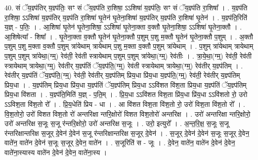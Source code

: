 \documentclass[17pt]{extarticle}
\begin{document}
40. सं ॅय॒ज्ञ्प॑तिर् य॒ज्ञ्प॑तिः॒ सꣳ सं ॅय॒ज्ञ्प॑ति रा॒शिषा॒ ऽऽशिषा॑ य॒ज्ञ्प॑तिः॒ सꣳ सं ॅय॒ज्ञ्प॑ति रा॒शिषा᳚ । . य॒ज्ञ्प॑ति रा॒शिषा॒ ऽऽशिषा॑ य॒ज्ञ्प॑तिर् य॒ज्ञ्प॑ति रा॒शिषा॑ घृ॒तेन॑ घृ॒तेना॒शिषा॑ य॒ज्ञ्प॑तिर् य॒ज्ञ्प॑ति रा॒शिषा॑ घृ॒तेन॑ । . य॒ज्ञ्प॑ति॒रिति॑ य॒ज्ञ् - प॒तिः॒ । . आ॒शिषा॑ घृ॒तेन॑ घृ॒तेना॒शिषा॒ ऽऽशिषा॑ घृ॒तेना॒क्ता व॒क्तौ घृ॒तेना॒शिषा॒ ऽऽशिषा॑ घृ॒तेना॒क्तौ । . आ॒शिषेत्या᳚ - शिषा᳚ । . घृ॒तेना॒क्ता व॒क्तौ घृ॒तेन॑ घृ॒तेना॒क्तौ प॒शुम् प॒शु म॒क्तौ घृ॒तेन॑ घृ॒तेना॒क्तौ प॒शुम् । . अ॒क्तौ प॒शुम् प॒शु म॒क्ता व॒क्तौ प॒शुम् त्रा॑येथाम् त्रायेथाम् प॒शु म॒क्ता व॒क्तौ प॒शुम् त्रा॑येथाम् । . प॒शुम् त्रा॑येथाम् त्रायेथाम् प॒शुम् प॒शुम् त्रा॑येथा॒(ग्म्॒) रेव॑ती॒ रेव॑ती स्त्रायेथाम् प॒शुम् प॒शुम् त्रा॑येथा॒(ग्म्॒) रेव॑तीः । . त्रा॒ये॒था॒(ग्म्॒) रेव॑ती॒ रेव॑ती स्त्रायेथाम् त्रायेथा॒(ग्म्॒) रेव॑तीर् य॒ज्ञ्प॑तिं ॅय॒ज्ञ्प॑ति॒(ग्म्॒) रेव॑ती स्त्रायेथाम् त्रायेथा॒(ग्म्॒) रेव॑तीर् य॒ज्ञ्प॑तिम् । . रेव॑तीर् य॒ज्ञ्प॑तिं ॅय॒ज्ञ्प॑ति॒(ग्म्॒) रेव॑ती॒ रेव॑तीर् य॒ज्ञ्प॑तिम् प्रिय॒धा प्रि॑य॒धा य॒ज्ञ्प॑ति॒(ग्म्॒) रेव॑ती॒ रेव॑तीर् य॒ज्ञ्प॑तिम् प्रिय॒धा । . य॒ज्ञ्प॑तिम् प्रिय॒धा प्रि॑य॒धा य॒ज्ञ्प॑तिं ॅय॒ज्ञ्प॑तिम् प्रिय॒धा ऽऽवि॑शत वि॑श॒ता प्रिय॒धा य॒ज्ञ्प॑तिं ॅय॒ज्ञ्प॑तिम् प्रिय॒धा वि॑शता । . य॒ज्ञ्प॑ति॒मिति॑ य॒ज्ञ् - प॒ति॒म् । . प्रि॒य॒धा ऽऽवि॑शत विश॒ता प्रि॑य॒धा प्रि॑य॒धा ऽऽवि॑शतो रो॒ उरो ऽऽविश॒ता वि॑श॒तो रो᳚ । . प्रि॒य॒धेति॑ प्रिय - धा । . आ वि॑शत विश॒ता वि॑श॒तो रो॒ उरो॑ विश॒ता वि॑श॒तो रो᳚ । . वि॒श॒तोरो॒ उरो॑ विशत विश॒तो रो॑ अन्तरिक्षा न्तरि॒क्षोरो॑ विशत विश॒तोरो॑ अन्तरिक्ष । . उरो॑ अन्तरिक्षा न्तरि॒क्षोरो॒ उरो॑ अन्तरिक्ष स॒जूः स॒जू र॑न्तरि॒क्षोरो॒ उरो॑ अन्तरिक्ष स॒जूः । . उरो॒ इत्युरो᳚ । . अ॒न्त॒रि॒क्ष॒ स॒जूः स॒जू र॑न्तरिक्षान्तरिक्ष स॒जूर् दे॒वेन॑ दे॒वेन॑ स॒जू र॑न्तरिक्षान्तरिक्ष स॒जूर् दे॒वेन॑ । . स॒जूर् दे॒वेन॑ दे॒वेन॑ स॒जूः स॒जूर् दे॒वेन॒ वाते॑न॒ वाते॑न दे॒वेन॑ स॒जूः स॒जूर् दे॒वेन॒ वाते॑न । . स॒जूरिति॑ स - जूः । . दे॒वेन॒ वाते॑न॒ वाते॑न दे॒वेन॑ दे॒वेन॒ वाते॑ना॒स्यास्य वाते॑न दे॒वेन॑ दे॒वेन॒ वाते॑ना॒स्य । \newline
\pagebreak
{}
\end{document}
